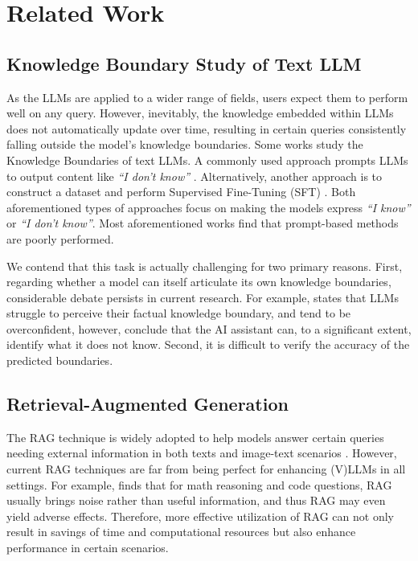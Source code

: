 \section{Related Work}

\subsection{Knowledge Boundary Study of Text LLM}
As the LLMs are applied to a wider range of fields, users expect them to perform well on any query. However, inevitably, the knowledge embedded within LLMs does not automatically update over time, resulting in certain queries consistently falling outside the model’s knowledge boundaries. Some works study the Knowledge Boundaries of text LLMs. A commonly used approach prompts LLMs to output content like \textit{``I don't know''} \cite{li2025refine, cheng2024can, ren2023investigating}. Alternatively, another approach is to construct a dataset and perform Supervised Fine-Tuning (SFT) \cite{zhang2024exploring, cheng2024can, li2025refine}. Both aforementioned types of approaches focus on making the models express \textit{``I know''} or \textit{``I don't know''}. Most aforementioned works find that prompt-based methods are poorly performed. 

We contend that this task is actually challenging for two primary reasons. First, regarding whether a model can itself articulate its own knowledge boundaries, considerable debate persists in current research. For example, \citet{ren2023investigating} states that LLMs struggle to perceive their factual knowledge boundary, and tend to be overconfident, however, \citet{cheng2024can} conclude that the AI assistant can, to a significant extent, identify what it does not know. Second, it is difficult to verify the accuracy of the predicted boundaries. 



\subsection{Retrieval-Augmented Generation}
The RAG technique is widely adopted to help models answer certain queries needing external information in both texts \cite{jeong2024adaptive, chen-etal-2024-improving-retrieval, lewis2020retrieval} and image-text scenarios \cite{lin-byrne-2022-retrieval, wu2022multi}. However, current RAG techniques are far from being perfect for enhancing (V)LLMs in all settings. For example, \citet{zhang2024exploring} finds that for math reasoning and code questions, RAG usually brings noise rather than useful information, and thus RAG may even yield adverse effects. Therefore, more effective utilization of RAG can not only result in savings of time and computational resources but also enhance performance in certain scenarios.


















